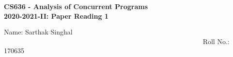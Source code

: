\documentclass[20pt]{letter}
\begin{document}
\begin{center}
{\LARGE \textbf{
CS636 - Analysis of Concurrent Programs\\
2020-2021-II: Paper Reading 1
}}\end{center}

{\Large
Name: Sarthak Singhal        ~~~~~~~~~~~~~~~~~~~~~~~~~~~~~~~~~~~~~~~~~~~~~~~~~~~~~~~~~~   Roll No.: 170635\\\\}



\end{document}
